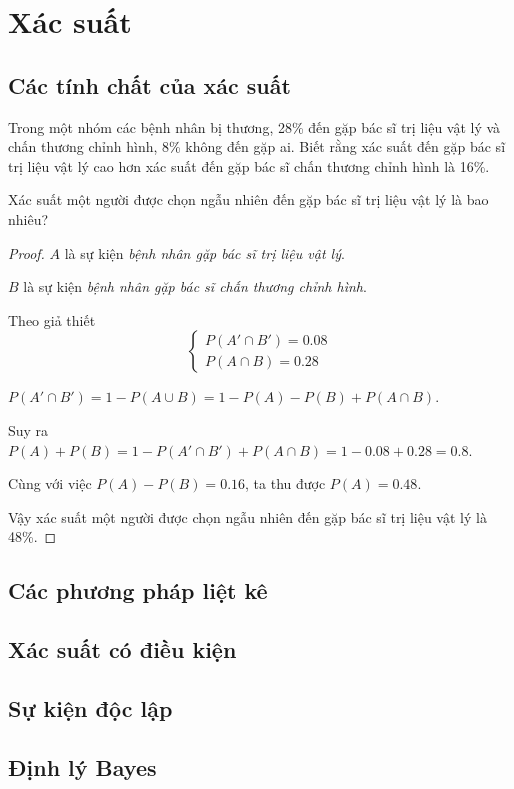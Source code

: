 \documentclass[class=probandstats,crop=false]{standalone}
\begin{document}
\chapter{Xác suất}

\section{Các tính chất của xác suất}

\begin{exercise}
    \par Trong một nhóm các bệnh nhân bị thương, 28\% đến gặp bác sĩ trị liệu vật lý và chấn thương chỉnh hình, 8\% không đến gặp ai. Biết rằng xác suất đến gặp bác sĩ trị liệu vật lý cao hơn xác suất đến gặp bác sĩ chấn thương chỉnh hình là 16\%.
    \par Xác suất một người được chọn ngẫu nhiên đến gặp bác sĩ trị liệu vật lý là bao nhiêu?
\end{exercise}

\begin{proof}
    \par $A$ là sự kiện \textit{bệnh nhân gặp bác sĩ trị liệu vật lý}.
    \par $B$ là sự kiện \textit{bệnh nhân gặp bác sĩ chấn thương chỉnh hình}.
    \bigskip
    \par Theo giả thiết
    \[
        \begin{cases}
            P(A'\cap B') = 0.08 \\
            P(A\cap B) = 0.28
        \end{cases}
    \]
    \par $P(A'\cap B') = 1 - P(A\cup B) = 1 - P(A) - P(B) + P(A\cap B)$.
    \par Suy ra $P(A) + P(B) = 1 - P(A'\cap B') + P(A\cap B) = 1 - 0.08 + 0.28 = 0.8$.
    \par Cùng với việc $P(A) - P(B) = 0.16$, ta thu được $P(A) = 0.48$.
    \par Vậy xác suất một người được chọn ngẫu nhiên đến gặp bác sĩ trị liệu vật lý là 48\%.
\end{proof}


\section{Các phương pháp liệt kê}



\section{Xác suất có điều kiện}



\section{Sự kiện độc lập}



\section{Định lý Bayes}
\end{document}
